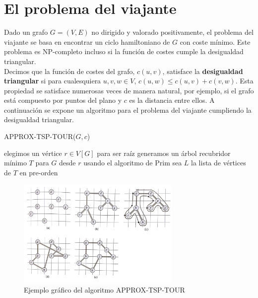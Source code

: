 \documentclass{article}
\begin{document}
\section{El problema del viajante}
Dado un grafo $G = (V,E)$ no dirigido y valorado positivamente, el problema del viajante se basa en encontrar un ciclo hamiltoniano de $G$ con coste mínimo. Este problema es NP-completo incluso si la función de costes cumple la desigualdad triangular.\\

Decimos que la función de costes del grafo, $c(u,v)$, satisface la \textbf{desigualdad triangular} si para cualesquiera $u, v, w \in V$, $c(u,w) \leq c(u,v) + c(v,w)$. Esta propiedad se satisface numerosas veces de manera natural, por ejemplo, si el grafo está compuesto por puntos del plano y $c$ es la distancia entre ellos. A continuación se expone un algoritmo para el problema del viajante cumpliendo la desigualdad triangular.

\begin{algorithm}[H]
\caption{APPROX-TSP-TOUR($G,c$)}
\begin{algorithmic}[1]
\STATE elegimos un vértice $r \in V[G]$ para ser raíz
\STATE generamos un árbol recubridor mínimo $T$ para $G$ desde $r$ usando el algoritmo de Prim
\STATE sea $L$ la lista de vértices de $T$ en pre-orden
\end{algorithmic}
\end{algorithm}

\begin{figure}[H]
  \centering
    \includegraphics[width=0.7\textwidth]{TSP}
  \caption{Ejemplo gráfico del algoritmo APPROX-TSP-TOUR}
\end{figure}
\end{document}
